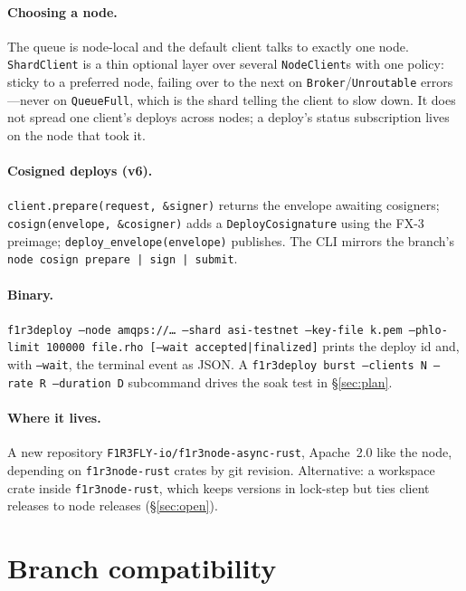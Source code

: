\documentclass[11pt]{article}
\newcommand{\code}[1]{\texttt{#1}}
\begin{document}
\paragraph{Choosing a node.} The queue is node-local and the default client talks to
exactly one node. \code{ShardClient} is a thin optional layer over several
\code{NodeClient}s with one policy: sticky to a preferred node, failing over to the
next on \code{Broker}/\code{Unroutable} errors---never on \code{QueueFull}, which is
the shard telling the client to slow down. It does not spread one client's deploys
across nodes; a deploy's status subscription lives on the node that took it.

\paragraph{Cosigned deploys (v6).} \code{client.prepare(request, \&signer)} returns
the envelope awaiting cosigners; \code{cosign(envelope, \&cosigner)} adds a
\code{DeployCosignature} using the FX-3 preimage; \code{deploy\_envelope(envelope)}
publishes. The CLI mirrors the branch's \code{node cosign prepare | sign | submit}.

\paragraph{Binary.} \code{f1r3deploy --node amqps://\ldots\ --shard asi-testnet
--key-file k.pem --phlo-limit 100000 file.rho [--wait accepted|finalized]} prints
the deploy id and, with \code{--wait}, the terminal event as JSON. A
\code{f1r3deploy burst --clients N --rate R --duration D} subcommand drives the soak
test in \S\ref{sec:plan}.

\paragraph{Where it lives.} A new repository \code{F1R3FLY-io/f1r3node-async-rust},
Apache~2.0 like the node, depending on \code{f1r3node-rust} crates by git revision.
Alternative: a  workspace crate inside \code{f1r3node-rust}, which
keeps versions in lock-step but ties client releases to node releases
(\S\ref{sec:open}).

\section{Branch compatibility}
\end{document}
